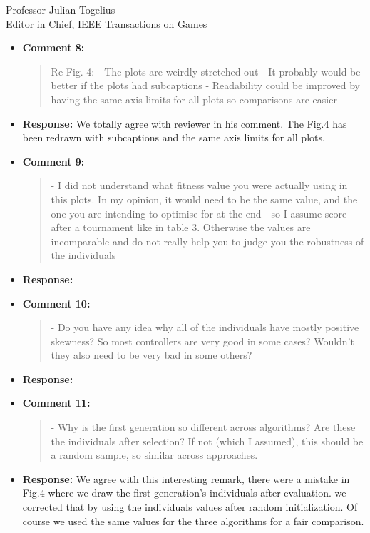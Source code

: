 \documentclass[10pt]{letter} %
\begin{document}
\begin{letter}{Professor Julian Togelius \\ Editor in Chief, IEEE Transactions on Games}
\begin{enumerate}
\begin{itemize}
{				Also and for comparison purpose, two reference controllers have been considered: {}[43] and {}[40], they both use the fitness function $f_{AVS}$ (Equation 1) value for selection.
				All these controllers are summarized in Table.2. 
			}
			\item {\bf Comment 8:}
				\begin{quote}	
					Re Fig. 4:
					- The plots are weirdly stretched out
					- It probably would be better if the plots had subcaptions
					- Readability could be improved by having the same axis limits for all plots so comparisons are easier
				\end{quote}	
			\item {\bf Response:} 
				We totally agree with reviewer in his comment. The Fig.4 has been redrawn with subcaptions and the same axis limits for all plots.
			\item {\bf Comment 9:}
				\begin{quote}	
					- I did not understand what fitness value you were actually using in this plots. In my opinion, it would need to be the same value, and the one you are intending to optimise for at the end - so I assume score after a tournament like in table 3. Otherwise the values are incomparable and do not really help you to judge you the robustness of the individuals
				\end{quote}	
			\item {\bf Response:} 
			\item {\bf Comment 10:}
				\begin{quote}	
					- Do you have any idea why all of the individuals have mostly positive skewness? So most controllers are very good in some cases? Wouldn't they also need to be very bad in some others?
				\end{quote}	
			\item {\bf Response:} 
			\item {\bf Comment 11:}
				\begin{quote}	
					- Why is the first generation so different across algorithms? Are these the individuals after selection? If not (which I assumed), this should be a random sample, so similar across approaches.
				\end{quote}	
			\item {\bf Response:} 
			We agree with this interesting remark, there were a mistake in Fig.4 where we draw the first generation's individuals after evaluation.
			we corrected  that by using the individuals values after random initialization. Of course we used the same values for the three algorithms for a fair comparison.
			

\end{itemize}
\end{enumerate}
\end{letter}
\end{document}
